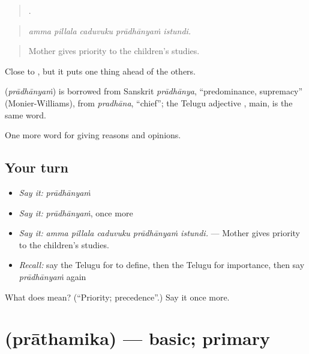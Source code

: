 \begin{quote}
    .
\end{quote}

\begin{quote}
\emph{amma pillala caduvuku prādhānyaṁ istundi.}
\end{quote}

\begin{quote}
Mother gives priority to the children’s studies.
\end{quote}

Close to , but it puts one thing ahead of the others.

\begin{cousinweb}
\textbf{} (\emph{prādhānyaṁ}) is borrowed from Sanskrit \emph{prādhānya}, \textquotedblleft{}predominance, supremacy\textquotedblright{} (Monier-Williams), from \emph{pradhāna}, \textquotedblleft{}chief\textquotedblright{}; the Telugu adjective , main, is the same word.
\end{cousinweb}

\begin{grammarlens}[title={What you've built}]
One more word for giving reasons and opinions.
\end{grammarlens}

\subsection*{Your turn}
\begin{itemize}
\raggedright
  \item \emph{Say it:} \emph{prādhānyaṁ}
  \item \emph{Say it:} \emph{prādhānyaṁ}, once more
  \item \emph{Say it:} \emph{amma pillala caduvuku prādhānyaṁ istundi.} — Mother gives priority to the children’s studies.
  \item \emph{Recall:} say the Telugu for to define, then the Telugu for importance, then say \emph{prādhānyaṁ} again
\end{itemize}

\begin{tcolorbox}[breakable,colback=teal!4,colframe=teal!35!black,title={Before you move on}]
What does  mean? (\textquotedblleft{}Priority; precedence\textquotedblright{}.) Say it once more.
\end{tcolorbox}
\section[\texorpdfstring{\te{ప్రాథమిక} (prāthamika)}{ప్రాథమిక (prāthamika)}]{ (prāthamika) — basic; primary}

